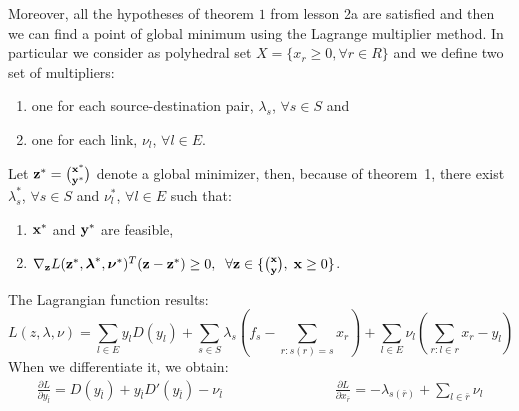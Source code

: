 Moreover, all the hypotheses of theorem $1$ from lesson 2a are satisfied and then we can find a point of global minimum using the Lagrange multiplier method.
In particular we consider as polyhedral set $X=\{x_r \ge 0, \forall r \in R\}$ and we define two set of multipliers:
\begin{enumerate}
        \item one for each source-destination pair, $\lambda_s$, $ \forall s \in S$ and
        \item one for each link, $\nu_l$, $\forall l \in E$.
\end{enumerate}
Let $\mathbf{z}^* = {\mathbf{x}^* \choose \mathbf{y}^*}$ denote a global minimizer, then, because of theorem~1,  there exist $\lambda_s^*$, $\forall s \in S$ and $\nu_l^*$, $\forall l \in E$ such that:
\begin{enumerate}
\item $\mathbf{x}^*$ and $\mathbf{y}^*$ are feasible,
\item $\nabla_{\mathbf{z}} L(\mathbf{z}^*,\boldsymbol{\lambda}^*,\boldsymbol{\nu}^*)^T (\mathbf{z} - \mathbf{z}^*) \ge 0,  \;\; \forall \mathbf{z} \in \{{\mathbf{x} \choose \mathbf{y}} ,\; \mathbf{x} \ge 0  \}$.
\end{enumerate}
The Lagrangian function results:
\begin{equation} 
L(z,\lambda,\nu)= \sum_{l \in E}  y_l D(y_l) + \sum_{s \in S} \lambda_{s} \left(f_s - \sum_{r:s(r)=s} x_r\right) + \sum_{l \in E} \nu_l \left(\sum_{r:l \in r} x_r - y_l\right) 
\end{equation}
When we differentiate it, we obtain:
\begin{equation}
\label{e:derivatives}
\begin{aligned}
        \frac{\partial L}{\partial y_{\bar{l}}}=D(y_{\bar{l}})+  y_{\bar{l}} D'(y_{\bar{l}}) -  \nu_{\bar{l}}  &&&&& &&&&& \frac{\partial L}{\partial x_{\bar{r}}}=- \lambda_{s(\bar{r})} + \sum_{l \in \bar{r}} \nu_l
\end{aligned}
\end{equation}


